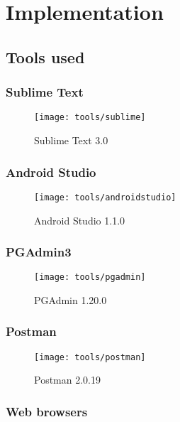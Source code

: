 \chapter{Implementation}

\section{Tools used}

\subsection*{Sublime Text}

\begin{figure}[h]
    \centering
    \texttt{[image: tools/sublime]}
    \caption{Sublime Text 3.0}
    \label{fig:sublime_text_image}
\end{figure} 
\noindent

\subsection*{Android Studio}

\begin{figure}[h]
    \centering
    \texttt{[image: tools/androidstudio]}
    \caption{Android Studio 1.1.0}
    \label{fig:android_studio_image}
\end{figure} 
\noindent

\subsection*{PGAdmin3}

\begin{figure}[h]
    \centering
    \texttt{[image: tools/pgadmin]}
    \caption{PGAdmin 1.20.0}
    \label{fig:pg_admin_image}
\end{figure} 
\noindent

\subsection*{Postman}

\begin{figure}[h]
    \centering
    \texttt{[image: tools/postman]}
    \caption{Postman 2.0.19}
    \label{fig:postman_image}
\end{figure} 
\noindent

\subsection*{Web browsers}

